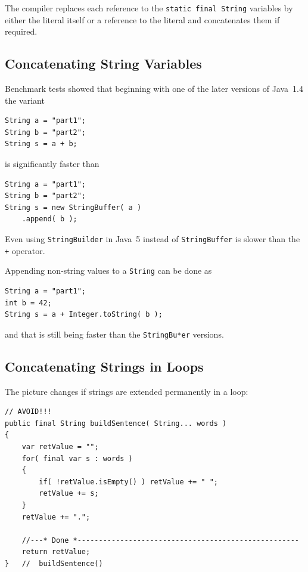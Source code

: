 The compiler replaces each reference to the \lstinline|static final String| variables by either the literal itself or a reference to the literal and concatenates them if required.


\subsection{Concatenating String Variables}
Benchmark tests showed that beginning with one of the later versions of Java~1.4 the variant
\begin{lstlisting}
String a = "part1";
String b = "part2";
String s = a + b;
\end{lstlisting}
is significantly faster than
\begin{lstlisting}
String a = "part1";
String b = "part2";
String s = new StringBuffer( a )
    .append( b );
\end{lstlisting}

Even using \lstinline|StringBuilder| in Java~5 instead of \lstinline|StringBuffer| is slower than the \verb#+# operator.

Appending non-string values to a \lstinline|String| can be done as
\begin{lstlisting}
String a = "part1";
int b = 42;
String s = a + Integer.toString( b );
\end{lstlisting}
and that is still being faster than the \lstinline|StringBu*er| versions.


\subsection{Concatenating Strings in Loops}
The picture changes if strings are extended permanently in a loop:
\begin{lstlisting}
// AVOID!!!
public final String buildSentence( String... words )
{
    var retValue = "";
    for( final var s : words )
    {
        if( !retValue.isEmpty() ) retValue += " ";
        retValue += s;
    }
    retValue += ".";
    
    //---* Done *----------------------------------------------------
    return retValue;
}   //  buildSentence()
\end{lstlisting}


